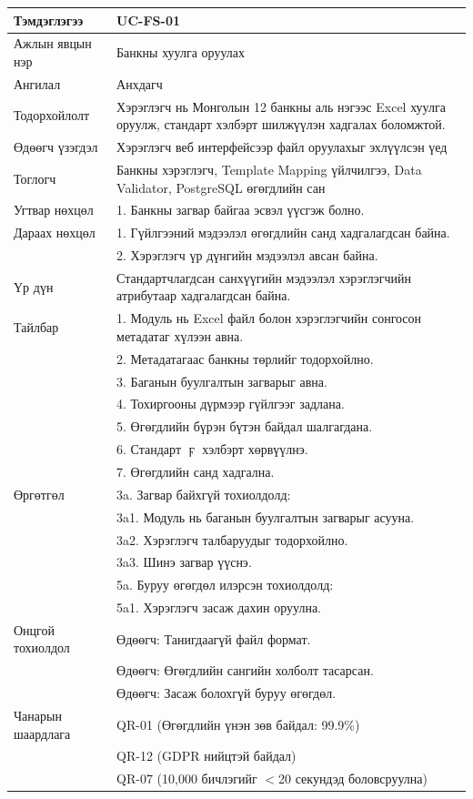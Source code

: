 \begin{longtable}{|L{4cm}|L{\dimexpr\textwidth-4cm-3\arrayrulewidth\relax}|}
Тэмдэглэгээ & UC-FS-01 \\ \hline
Ажлын явцын нэр & Банкны хуулга оруулах \\ \hline
Ангилал & Анхдагч \\ \hline
Тодорхойлолт & Хэрэглэгч нь Монголын 12 банкны аль нэгээс Excel хуулга оруулж, стандарт хэлбэрт шилжүүлэн хадгалах боломжтой. \\ \hline
Өдөөгч үзэгдэл & Хэрэглэгч веб интерфейсээр файл оруулахыг эхлүүлсэн үед \\ \hline
Тоглогч & Банкны хэрэглэгч, Template Mapping үйлчилгээ, Data Validator, PostgreSQL өгөгдлийн сан \\ \hline
Угтвар нөхцөл & 1. Банкны загвар байгаа эсвэл үүсгэж болно.\\ \hline
Дараах нөхцөл & 1. Гүйлгээний мэдээлэл өгөгдлийн санд хадгалагдсан байна.\\
                & 2. Хэрэглэгч үр дүнгийн мэдээлэл авсан байна. \\ \hline
Үр дүн & Стандартчлагдсан санхүүгийн мэдээлэл хэрэглэгчийн атрибутаар хадгалагдсан байна. \\ \hline
Тайлбар & 1. Модуль нь Excel файл болон хэрэглэгчийн сонгосон метадатаг хүлээн авна.\\
              & 2. Метадатагаас банкны төрлийг тодорхойлно.\\
              & 3. Баганын буулгалтын загварыг авна.\\
              & 4. Тохиргооны дүрмээр гүйлгээг задлана.\\
              & 5. Өгөгдлийн бүрэн бүтэн байдал шалгагдана.\\
              & 6. Стандарт $\digamma$ хэлбэрт хөрвүүлнэ.\\
              & 7. Өгөгдлийн санд хадгална.\\ \hline
Өргөтгөл & 3a. Загвар байхгүй тохиолдолд: \\ 
                      & \quad 3a1. Модуль нь баганын буулгалтын загварыг асууна. \\ 
                      & \quad 3a2. Хэрэглэгч талбаруудыг тодорхойлно. \\ 
                      & \quad 3a3. Шинэ загвар үүснэ. \\ 
                      & 5a. Буруу өгөгдөл илэрсэн тохиолдолд: \\ 
                      & \quad 5a1. Хэрэглэгч засаж дахин оруулна. \\ \hline
Онцгой тохиолдол & Өдөөгч: Танигдаагүй файл формат.\\ 
                    & Өдөөгч: Өгөгдлийн сангийн холболт тасарсан.\\ 
                    & Өдөөгч: Засаж болохгүй буруу өгөгдөл. \\ \hline
Чанарын шаардлага & QR-01 (Өгөгдлийн үнэн зөв байдал: 99.9\%)\\ 
          & QR-12 (GDPR нийцтэй байдал)\\ 
          & QR-07 (10,000 бичлэгийг $<$20 секундэд боловсруулна) \\ \hline

\end{longtable}
